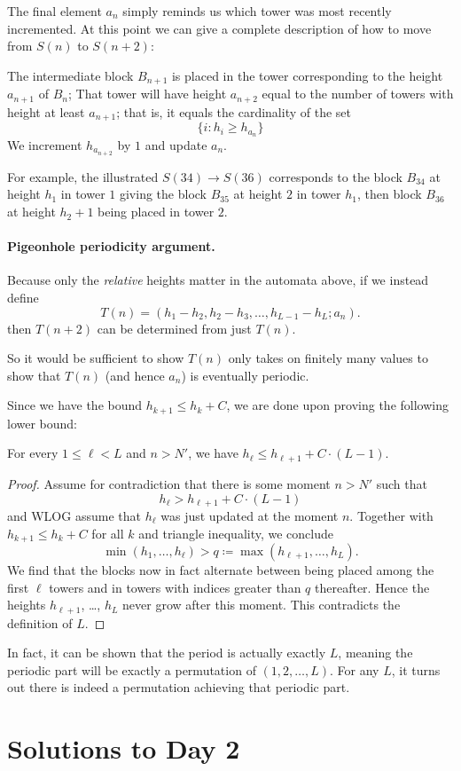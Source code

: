 The final element $a_n$ simply reminds us which tower was most recently incremented.
At this point we can give a complete description of how to move from $S(n)$ to $S(n+2)$:
\begin{itemize}
  \ii The intermediate block $B_{n+1}$ is placed in the tower
  corresponding to the height $a_{n+1}$ of $B_n$;
  \ii That tower will have height $a_{n+2}$ equal to the number of towers
  with height at least $a_{n+1}$; that is, it equals the cardinality of the set
  \[ \{ i \colon h_i \ge h_{a_n} \} \]
  \ii We increment $h_{a_{n+2}}$ by $1$ and update $a_n$.
\end{itemize}

For example, the illustrated $S(34) \to S(36)$
corresponds to the block $B_{34}$ at height $h_1$ in tower $1$
giving the block $B_{35}$ at height $2$ in tower $h_1$,
then block $B_{36}$ at height $h_2 + 1$ being placed in tower $2$.


\paragraph{Pigeonhole periodicity argument.}
Because only the \emph{relative} heights matter in the automata above,
if we instead define
\[ T(n) = (h_1-h_2, h_2-h_3, \dots, h_{L-1}-h_L; a_n). \]
then $T(n+2)$ can be determined from just $T(n)$.

So it would be sufficient to show $T(n)$ only takes on finitely many values
to show that $T(n)$ (and hence $a_n$) is eventually periodic.

Since we have the bound $h_{k+1} \le h_k + C$,
we are done upon proving the following lower bound:
\begin{claim*}
  For every $1 \le \ell < L$ and $n > N'$,
  we have $h_\ell \le h_{\ell+1} + C \cdot (L-1)$.
\end{claim*}
\begin{proof}
  Assume for contradiction that there is some moment $n > N'$ such that
  \[ h_\ell > h_{\ell+1} + C \cdot (L-1) \]
  and WLOG assume that $h_\ell$ was just updated at the moment $n$.
  Together with $h_{k+1} \le h_k + C$ for all $k$ and triangle inequality, we conclude
  \[ \min(h_1, \dots, h_\ell) > q \coloneqq \max(h_{\ell+1}, \dots, h_L). \]
  We find that the blocks now in fact alternate between being placed
  among the first $\ell$ towers and in towers with indices greater than $q$ thereafter.
  Hence the heights $h_{\ell+1}$, \dots, $h_L$ never grow after this moment.
  This contradicts the definition of $L$.
\end{proof}

\begin{remark*}
  In fact, it can be shown that the period is actually exactly $L$,
  meaning the periodic part will be exactly a permutation of $(1,2,\dots,L)$.
  For any $L$, it turns out there is indeed a permutation achieving that periodic part.
\end{remark*}
\pagebreak

\section{Solutions to Day 2}
